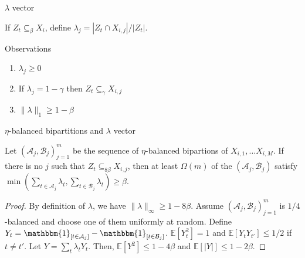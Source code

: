 \documentclass{beamer}
\newcommand{\1}{\mathbbm{1}}
\newcommand{\A}{\mathcal{A}}
\newcommand{\B}{\mathcal{B}}
\newcommand{\indicator}[1]{\1_{[#1]}}
\newcommand{\Exp}[1]{\mathbb{E}\left [#1 \right ]}
\begin{document}
\begin{frame}{$\lambda$ vector}
  \begin{definition}
    If $Z_t \subseteq_\beta X_i$, define $\lambda_j = |Z_t \cap X_{i, j}| / |Z_t|$.
  \end{definition}

  \pause

  \begin{block}{Observations}
    \begin{enumerate}
      \pause
      \item $\lambda_j \ge 0$
            \pause
      \item If $\lambda_j = 1 - \gamma$ then $Z_t \subseteq_\gamma X_{i, j}$
            \pause
      \item $\lVert \lambda \rVert_1 \ge 1 - \beta$
    \end{enumerate}
  \end{block}
\end{frame}

\begin{frame}{$\eta$-balanced bipartitions and $\lambda$ vector}
  \begin{lemma}
    Let $(\A_j, \B_j)_{j = 1}^m$ be the sequence of $\eta$-balanced bipartions of $X_{i,
          1}, \dots X_{i, M}$. If there is no $j$ such that $Z_t \subseteq_{8 \beta} X_{i, j}$,
    then at least $\Omega(m)$ of the $(\A_j, \B_j)$ satisfy $\min(\sum_{t \in \A_j}
      \lambda_t, \sum_{t \in \B_j} \lambda_t) \ge \beta$.
  \end{lemma}

  \pause

  \begin{proof}
    By definition of $\lambda$, we have $\lVert \lambda \rVert_\infty \ge 1 - 8\beta$.
    \pause
    Assume $(\A_j, \B_j)_{j = 1}^m$ is $1/4$-balanced and choose one of them uniformly at
    random.
    \pause
    Define $Y_t = \indicator{t \in \A_j} - \indicator{t \in \B_j}$.
    \pause
    $\Exp{Y_t^2} = 1$ and $\Exp{Y_t Y_{t'}} \le 1/2$ if $t \ne t'$.
    \pause
    Let $Y = \sum_t \lambda_t Y_t$.
    \pause
    Then, $\Exp{Y^2} \le 1 - 4 \beta$ and $\Exp{|Y|} \le 1 - 2 \beta$.
  \end{proof}
\end{frame}
\end{document}
